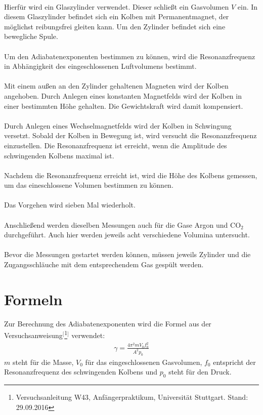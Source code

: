 \documentclass[12pt,a4paper,]{scrreprt}
\begin{document}
\ \\
Hierfür wird ein Glaszylinder verwendet. Dieser schließt ein Gasvolumen $V$ ein. In diesem Glaszylinder befindet sich ein Kolben mit Permanentmagnet, der möglichst reibungsfrei gleiten kann. Um den Zylinder befindet sich eine bewegliche Spule. \\
\\
Um den Adiabatenexponenten bestimmen zu können, wird die Resonanzfrequenz in Abhängigkeit des eingeschlossenen Luftvolumens bestimmt. \\
\\
Mit einem außen an den Zylinder gehaltenen Magneten wird der Kolben angehoben. Durch Anlegen eines konstanten Magnetfelds wird der Kolben in einer bestimmten Höhe gehalten. Die Gewichtskraft wird damit kompensiert.\\
\\
Durch Anlegen eines Wechselmagnetfelds wird der Kolben in Schwingung versetzt. Sobald der Kolben in Bewegung ist, wird versucht die Resonanzfrequenz einzustellen. Die Resonanzfrequenz ist erreicht, wenn die Amplitude des schwingenden Kolbens maximal ist.\\
\\
Nachdem die Resonanzfrequenz erreicht ist, wird die Höhe des Kolbens gemessen, um das eineschlossene Volumen bestimmen zu können. \\
\\
Das Vorgehen wird sieben Mal wiederholt.\\
\\
Anschließend werden dieselben Messungen auch für die Gase Argon und CO$_2$ durchgeführt. Auch hier werden jeweils acht verschiedene Volumina untersucht.\\
\\
Bevor die Messungen gestartet werden können, müssen jeweils Zylinder und die Zugangsschläuche mit dem entsprechendem Gas gespült werden.
	\pagebreak
    
\chapter{Formeln}

Zur Berechnung des Adiabatenexponenten wird die Formel aus der Versuchsanweisung$^[$\footnote{Versuchsanleitung W43, Anfängerpraktikum, Universität Stuttgart. Stand: 29.09.2016}$^]$ verwendet:
\begin{align}
     		\gamma = \frac{4\pi^2 m V_0 f_0^2}{A^2 p_0}
            \label{gamma}
      \end{align}
      $m$ steht für die Masse,  $V_0$ für das eingeschlossenen Gasvolumen, $f_0$ entspricht der Resonanzfrequenz des schwingenden Kolbens und $p_0$ steht für den Druck.
	\pagebreak
\end{document}
